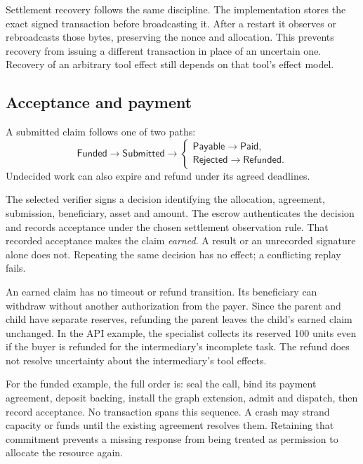 Settlement recovery follows the same discipline. The implementation stores the
exact signed transaction before broadcasting it. After a restart it observes
or rebroadcasts those bytes, preserving the nonce and allocation. This prevents
recovery from issuing a different transaction in place of an uncertain one.
Recovery of an arbitrary tool effect still depends on that tool's effect model.

\subsection{Acceptance and payment}
A submitted claim follows one of two paths:
\[
 \textsf{Funded}\to\textsf{Submitted}\to
 \begin{cases}
  \textsf{Payable}\to\textsf{Paid},\\
  \textsf{Rejected}\to\textsf{Refunded}.
 \end{cases}
\]
Undecided work can also expire and refund under its agreed deadlines.

The selected verifier signs a decision identifying the allocation, agreement,
submission, beneficiary, asset and amount. The escrow authenticates the
decision and records acceptance under the chosen settlement observation rule.
That recorded acceptance makes the claim \emph{earned}. A result or an
unrecorded signature alone does not. Repeating the same decision has no effect;
a conflicting replay fails.

An earned claim has no timeout or refund transition. Its beneficiary can
withdraw without another authorization from the payer. Since the parent and
child have separate reserves, refunding the parent leaves the child's earned
claim unchanged. In the API example, the specialist collects its reserved
100 units even if the buyer is refunded for the intermediary's incomplete task.
The refund does not resolve uncertainty about the intermediary's tool effects.

For the funded example, the full order is: seal the call, bind its payment
agreement, deposit backing, install the graph extension, admit and dispatch,
then record acceptance.
No transaction spans this sequence. A crash may strand capacity or funds until
the existing agreement resolves them. Retaining that commitment prevents a
missing response from being treated as permission to allocate the resource
again.
